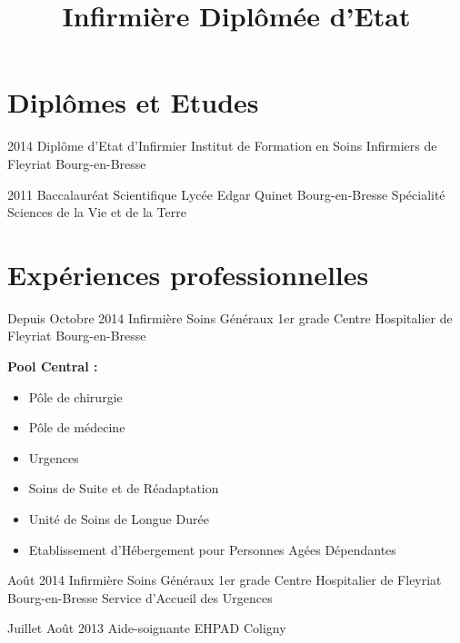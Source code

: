 \documentclass[10pt,a4paper,sans]{moderncv}
\title{Infirmière Diplômée d'Etat}
\begin{document}
\maketitle
\pagestyle{empty}


\section{Diplômes et Etudes}

\cventry
	{2014}
	{Diplôme d'Etat d'Infirmier}
	{Institut de Formation en Soins Infirmiers de Fleyriat}
	{Bourg-en-Bresse}
	{}
	{}

\cventry
	{2011}
	{Baccalauréat Scientifique}
	{Lycée Edgar Quinet}
	{Bourg-en-Bresse}
	{}
	{Spécialité Sciences de la Vie et de la Terre}



\section{Expériences professionnelles}

\cventry
	{Depuis Octobre 2014}
	{Infirmière Soins Généraux 1er grade}
	{Centre Hospitalier de Fleyriat}
	{Bourg-en-Bresse}
	{}
	{\textbf{Pool Central :}
		\begin{itemize}
			\item Pôle de chirurgie
			\item Pôle de médecine
			\item Urgences
			\item Soins de Suite et de Réadaptation
			\item Unité de Soins de Longue Durée
			\item Etablissement d'Hébergement pour Personnes Agées Dépendantes
		\end{itemize}
	}

\vspace*{3mm}

\cventry
	{Août 2014}
	{Infirmière Soins Généraux 1er grade}
	{Centre Hospitalier de Fleyriat}
	{Bourg-en-Bresse}
	{}
	{Service d'Accueil des Urgences}

\cventry
	{Juillet Août 2013}
	{Aide-soignante}
	{EHPAD}
	{Coligny}
	{}
	{}
\end{document}
